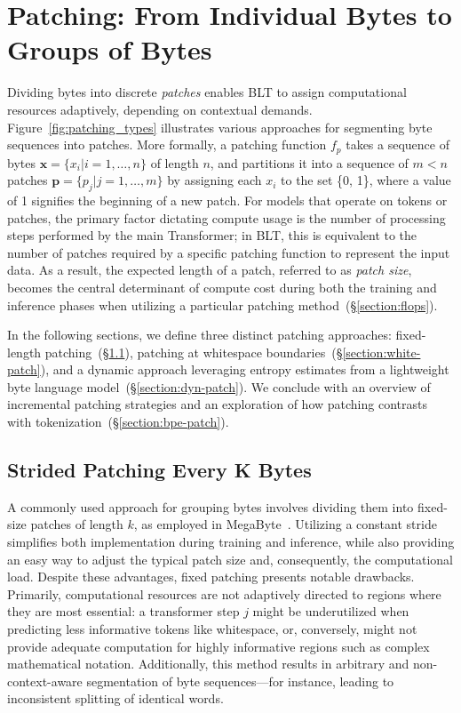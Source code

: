 \section{Patching: From Individual Bytes to Groups of Bytes}
\label{section:patching}

Dividing bytes into discrete \textit{patches} enables {\textsc BLT} to assign computational resources adaptively, depending on contextual demands. Figure~\ref{fig:patching_types} illustrates various approaches for segmenting byte sequences into patches. More formally, a patching function $f_p$ takes a sequence of bytes $\pmb{x} = \{x_i | i = 1, \ldots, n\}$ of length $n$, and partitions it into a sequence of $m < n$ patches $\pmb{p} = \{p_j | j = 1, \ldots, m\}$ by assigning each $x_i$ to the set \{0, 1\}, where a value of 1 signifies the beginning of a new patch. For models that operate on tokens or patches, the primary factor dictating compute usage is the number of processing steps performed by the main Transformer; in {\textsc BLT}, this is equivalent to the number of patches required by a specific patching function to represent the input data. As a result, the expected length of a patch, referred to as \textit{patch size}, becomes the central determinant of compute cost during both the training and inference phases when utilizing a particular patching method~(\S\ref{section:flops}). 

In the following sections, we define three distinct patching approaches: fixed-length patching~(\S\ref{section:static-patch}), patching at whitespace boundaries~(\S\ref{section:white-patch}), and a dynamic approach leveraging entropy estimates from a lightweight byte language model~(\S\ref{section:dyn-patch}). We conclude with an overview of incremental patching strategies and an exploration of how patching contrasts with tokenization~(\S\ref{section:bpe-patch}).

\subsection{Strided Patching Every K Bytes}
\label{section:static-patch}

A commonly used approach for grouping bytes involves dividing them into fixed-size patches of length $k$, as employed in MegaByte~\citep{yu2023megabyte}. Utilizing a constant stride simplifies both implementation during training and inference, while also providing an easy way to adjust the typical patch size and, consequently, the computational load. Despite these advantages, fixed patching presents notable drawbacks. Primarily, computational resources are not adaptively directed to regions where they are most essential: a transformer step $j$ might be underutilized when predicting less informative tokens like whitespace, or, conversely, might not provide adequate computation for highly informative regions such as complex mathematical notation. Additionally, this method results in arbitrary and non-context-aware segmentation of byte sequences—for instance, leading to inconsistent splitting of identical words.

